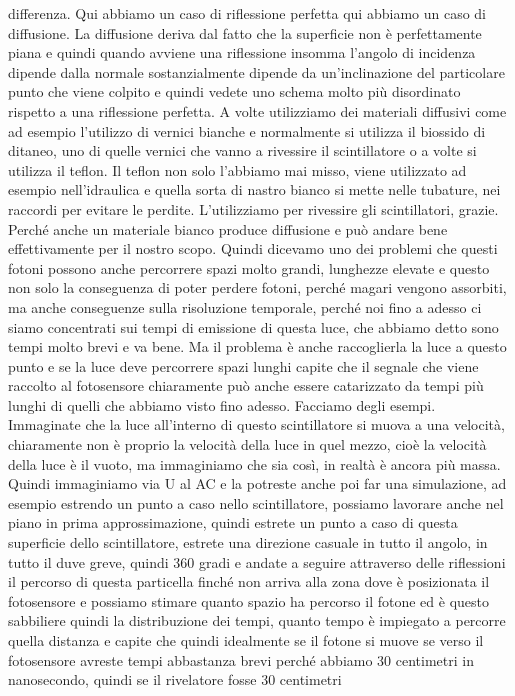 differenza. Qui abbiamo un caso di riflessione perfetta qui abbiamo un caso di diffusione. La diffusione deriva dal fatto che la superficie non è perfettamente piana e quindi quando avviene una riflessione insomma l'angolo di incidenza dipende dalla normale sostanzialmente dipende da un'inclinazione del particolare punto che viene colpito e quindi vedete uno schema molto più disordinato rispetto a una riflessione perfetta. A volte utilizziamo dei materiali diffusivi come ad esempio l'utilizzo di vernici bianche e normalmente si utilizza il biossido di ditaneo, uno di quelle vernici che vanno a rivessire il scintillatore o a volte si utilizza il teflon. Il teflon non solo l'abbiamo mai misso, viene utilizzato ad esempio nell'idraulica e quella sorta di nastro bianco si mette nelle tubature, nei raccordi per evitare le perdite. L'utilizziamo per rivessire gli scintillatori, grazie. Perché anche un materiale bianco produce diffusione e può andare bene effettivamente per il nostro scopo. Quindi dicevamo uno dei problemi che questi fotoni possono anche percorrere spazi molto grandi, lunghezze elevate e questo non solo la conseguenza di poter perdere fotoni, perché magari vengono assorbiti, ma anche conseguenze sulla risoluzione temporale, perché noi fino a adesso ci siamo concentrati sui tempi di emissione di questa luce, che abbiamo detto sono tempi molto brevi e va bene. Ma il problema è anche raccoglierla la luce a questo punto e se la luce deve percorrere spazi lunghi capite che il segnale che viene raccolto al fotosensore chiaramente può anche essere catarizzato da tempi più lunghi di quelli che abbiamo visto fino adesso. Facciamo degli esempi. Immaginate che la luce all'interno di questo scintillatore si muova a una velocità, chiaramente non è proprio la velocità della luce in quel mezzo, cioè la velocità della luce è il vuoto, ma immaginiamo che sia così, in realtà è ancora più massa. Quindi immaginiamo via U al AC e la potreste anche poi far una simulazione, ad esempio estrendo un punto a caso nello scintillatore, possiamo lavorare anche nel piano in prima approssimazione, quindi estrete un punto a caso di questa superficie dello scintillatore, estrete una direzione casuale in tutto il angolo, in tutto il duve greve, quindi 360 gradi e andate a seguire attraverso delle riflessioni il percorso di questa particella finché non arriva alla zona dove è posizionata il fotosensore e possiamo stimare quanto spazio ha percorso il fotone ed è questo sabbiliere quindi la distribuzione dei tempi, quanto tempo è impiegato a percorre quella distanza e capite che quindi idealmente se il fotone si muove se verso il fotosensore avreste tempi abbastanza brevi perché abbiamo 30 centimetri in nanosecondo, quindi se il rivelatore fosse 30 centimetri 

